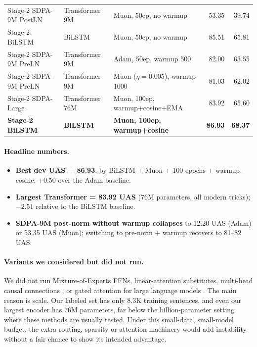 \begin{table}[t]
{\begin{tabular}{@{}lllrr@{}}
Stage-2 SDPA-9M PostLN & Transformer 9M    & Muon, 50ep, no warmup               & 53.35 & 39.74 \\
Stage-2 BiLSTM         & BiLSTM            & Muon, 50ep, no warmup               & 85.51 & 65.81 \\
\midrule
Stage-2 SDPA-9M PreLN  & Transformer 9M    & Adam, 50ep, warmup 500              & 82.00 & 63.55 \\
Stage-2 SDPA-9M PreLN  & Transformer 9M    & Muon ($\eta{=}0.005$), warmup 1000  & 81.03 & 62.02 \\
Stage-2 SDPA-Large     & Transformer 76M   & Muon, 100ep, warmup+cosine+EMA      & 83.92 & 65.60 \\
\textbf{Stage-2 BiLSTM} & \textbf{BiLSTM}   & \textbf{Muon, 100ep, warmup+cosine} & \textbf{86.93} & \textbf{68.37} \\
\bottomrule
\end{tabular}
}
\end{table}

\paragraph{Headline numbers.}
\begin{itemize}[leftmargin=*, itemsep=2pt]
  \item \textbf{Best dev UAS = 86.93}, by BiLSTM + Muon + 100 epochs + warmup--cosine; $+0.50$ over the Adam baseline.
  \item \textbf{Largest Transformer = 83.92 UAS} (76M parameters, all modern tricks); $-2.51$ relative to the BiLSTM baseline.
  \item \textbf{SDPA-9M post-norm without warmup collapses} to 12.20 UAS (Adam) or 53.35 UAS (Muon); switching to pre-norm + warmup recovers to 81--82 UAS.
\end{itemize}

\paragraph{Variants we considered but did not run.} We did not run Mixture-of-Experts FFNs, linear-attention substitutes, multi-head causal connections \citep{deepseekteam2025mhc}, or gated attention for large language models \citep{qiu2025gatedattention}. The main reason is scale. Our labeled set has only 8.3K training sentences, and even our largest encoder has 76M parameters, far below the billion-parameter setting where these methods are usually tested. Under this small-data, small-model budget, the extra routing, sparsity or attention machinery would add instability without a fair chance to show its intended advantage.
